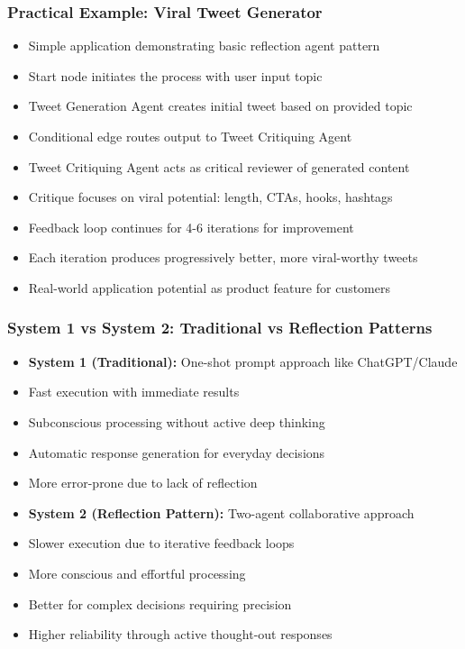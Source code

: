 \begin{frame}[fragile]\frametitle{Practical Example: Viral Tweet Generator}
      \begin{itemize}
        \item Simple application demonstrating basic reflection agent pattern
        \item Start node initiates the process with user input topic
        \item Tweet Generation Agent creates initial tweet based on provided topic
        \item Conditional edge routes output to Tweet Critiquing Agent
        \item Tweet Critiquing Agent acts as critical reviewer of generated content
        \item Critique focuses on viral potential: length, CTAs, hooks, hashtags
        \item Feedback loop continues for 4-6 iterations for improvement
        \item Each iteration produces progressively better, more viral-worthy tweets
        \item Real-world application potential as product feature for customers
      \end{itemize}
\end{frame}
\begin{frame}[fragile]\frametitle{System 1 vs System 2: Traditional vs Reflection Patterns}
      \begin{itemize}
        \item \textbf{System 1 (Traditional):} One-shot prompt approach like ChatGPT/Claude
        \item Fast execution with immediate results
        \item Subconscious processing without active deep thinking
        \item Automatic response generation for everyday decisions
        \item More error-prone due to lack of reflection
        \item \textbf{System 2 (Reflection Pattern):} Two-agent collaborative approach
        \item Slower execution due to iterative feedback loops
        \item More conscious and effortful processing
        \item Better for complex decisions requiring precision
        \item Higher reliability through active thought-out responses
      \end{itemize}
\end{frame}
